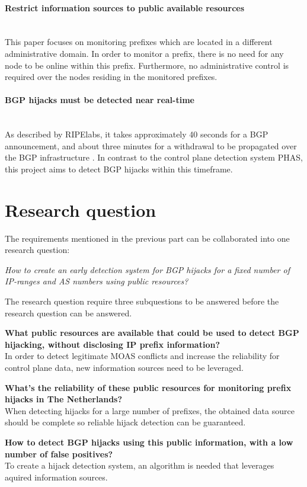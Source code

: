 \paragraph{Restrict information sources to public available resources}\mbox{}\\
This paper focuses on monitoring prefixes which are located in a different administrative domain. In order to monitor a prefix, there is no need for any node to be online within this prefix. Furthermore, no administrative control is required over the nodes residing in the monitored prefixes.

\paragraph{BGP hijacks must be detected near real-time}\mbox{}\\
As described by RIPElabs, it takes approximately 40 seconds for a BGP announcement, and about three minutes for a withdrawal to be propagated over the BGP infrastructure \cite{ripelabsbgpupdates}. In contrast to the control plane detection system PHAS\cite{lad2006phas}, this project aims to detect BGP hijacks within this timeframe.

\section{Research question}\label{sec:researchquestion}
The requirements mentioned in the previous part can be collaborated into one research question:

\begin{center}
\textit{How to create an early detection system for BGP hijacks for a fixed number of IP-ranges and AS numbers using public resources?}
\end{center}

The research question require three subquestions to be answered before the research question can be answered. 

\begin{description}
    \item{\textbf{What public resources are available that could be used to detect BGP hijacking, without disclosing IP prefix information?}}\hfill \\ In order to detect legitimate MOAS conflicts and increase the reliability for control plane data, new information sources need to be leveraged.
    \item{\textbf{What's the reliability of these public resources for monitoring prefix hijacks in The Netherlands?}}\hfill \\ When detecting hijacks for a large number of prefixes, the obtained data source should be complete so reliable hijack detection can be guaranteed.
    \item{\textbf{How to detect BGP hijacks using this public information, with a low number of false positives?}}\hfill \\ To create a hijack detection system, an algorithm is needed that leverages aquired information sources.
\end{description}
